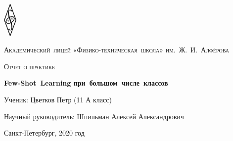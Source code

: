 \documentclass[a4paper, 12pt]{report}
\begin{document}
\begin{titlepage}
	\centering
	\includegraphics[width=0.05\textwidth]{pths}\par\vspace{0.5cm}
	{\scshape\Large  Академический~лицей «Физико-техническая~школа» им.~Ж.~И.~Алфёрова \par}
	\vspace{1.0cm}
	{\scshape\large Отчет о практике \par}
	\vspace{3cm}
	{\huge\bfseries Few-Shot~Learning при~большом~числе~классов \par}
	\vspace{3cm}
	{\large Ученик: Цветков Петр (11 А класс) \par}
	\vspace{0.25cm}
	{\large Научный руководитель: Шпильман Алексей Александрович \par}


	\vfill

	{\large Санкт-Петербург, 2020 год\par}
\end{titlepage}
	
	\begin{abstract}
	Few-Shot Learning (FSL) - активно исследуемая в наше время задача в области компьютерного зрения, подразумевающая классификацию изображений на основе малого числа примеров. В данной работе, помимо традиционного сценария FSL (5 классов, по 1 или 5 примеров на класс), рассматривается усложненная и более приближенная к практике версия задачи, в котором количество классов много больше, чем число образцов для каждого класса (100 классов, по 5 примеров на класс), а так же задача применения опыта, полученного из одного датасета, к другому. Для этого был выбран метод решения, основанных на т. н. ProtoNet Classifier \cite{closerlook}. Были проанализированы современные исследования в этой области, описанные в них модели реализованы, по-разному скомбинированы и протестированы в описанных сценариях. Для оценки использовался как популярный среди исследователей датасет miniImageNet \cite{imagenet}, так и собранный самостоятельно для многоклассовой задачи датасет, представляющий собой подмножество GoogleLandmarks \cite{google}. В результате работы были определены наиболее эффективные методы решения FSL для различных сценариев, что может быть полезно как при будущих исследованиях, так и при создании промышленных решений в области компьютерного зрения.
	\end{abstract}
	
\end{document}
